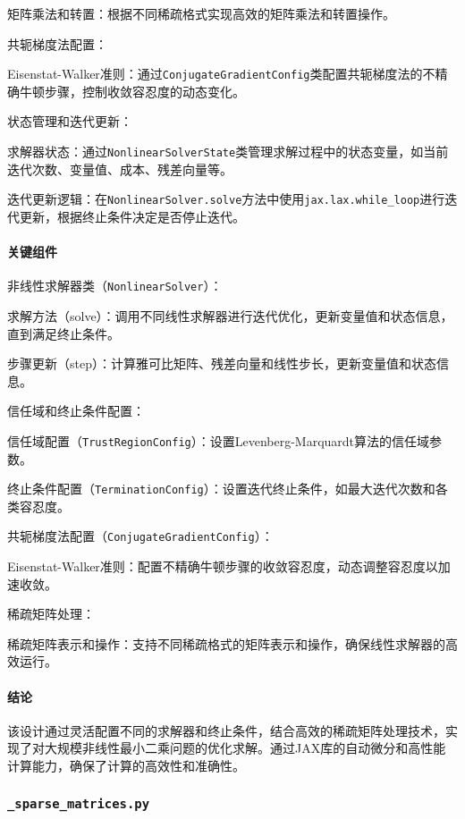 \documentclass{ctexart}
\begin{document}
矩阵乘法和转置：根据不同稀疏格式实现高效的矩阵乘法和转置操作。

共轭梯度法配置：

Eisenstat-Walker准则：通过\texttt{ConjugateGradientConfig}类配置共轭梯度法的不精确牛顿步骤，控制收敛容忍度的动态变化。

状态管理和迭代更新：

求解器状态：通过\texttt{NonlinearSolverState}类管理求解过程中的状态变量，如当前迭代次数、变量值、成本、残差向量等。

迭代更新逻辑：在\texttt{NonlinearSolver.solve}方法中使用\texttt{jax.lax.while\_loop}进行迭代更新，根据终止条件决定是否停止迭代。

\paragraph{关键组件}

非线性求解器类（\texttt{NonlinearSolver}）：

求解方法（solve）：调用不同线性求解器进行迭代优化，更新变量值和状态信息，直到满足终止条件。

步骤更新（step）：计算雅可比矩阵、残差向量和线性步长，更新变量值和状态信息。

信任域和终止条件配置：

信任域配置（\texttt{TrustRegionConfig}）：设置Levenberg-Marquardt算法的信任域参数。

终止条件配置（\texttt{TerminationConfig}）：设置迭代终止条件，如最大迭代次数和各类容忍度。

共轭梯度法配置（\texttt{ConjugateGradientConfig}）：

Eisenstat-Walker准则：配置不精确牛顿步骤的收敛容忍度，动态调整容忍度以加速收敛。

稀疏矩阵处理：

稀疏矩阵表示和操作：支持不同稀疏格式的矩阵表示和操作，确保线性求解器的高效运行。

\paragraph{结论}

该设计通过灵活配置不同的求解器和终止条件，结合高效的稀疏矩阵处理技术，实现了对大规模非线性最小二乘问题的优化求解。通过JAX库的自动微分和高性能计算能力，确保了计算的高效性和准确性。

\subsubsection{\texttt{\_sparse\_matrices.py}}
\end{document}
